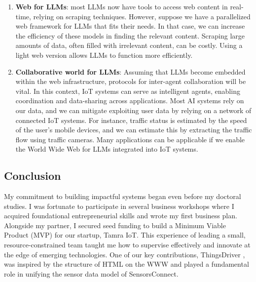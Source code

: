 \documentclass[10pt, letterpaper]{article}
\begin{document}
\begin{enumerate}[leftmargin=1.5em, label=\arabic*., itemsep=1em]
    \item \textbf{Web for LLMs}: most LLMs now have tools to access web content in real-time, relying on scraping techniques. However, suppose we have a parallelized web framework for LLMs that fits their needs. In that case, we can increase the efficiency of these models in finding the relevant content. Scraping large amounts of data, often filled with irrelevant content, can be costly. Using a light web version allows LLMs to function more efficiently. 

\item \textbf{Collaborative world for LLMs}:
Assuming that LLMs become embedded within the web infrastructure, protocols for inter-agent collaboration will be vital. In this context, IoT systems can serve as intelligent agents, enabling coordination and data-sharing across applications. Most AI systems rely on our data, and we can mitigate exploiting user data by relying on a network of connected IoT systems. For instance, traffic status is estimated by the speed of the user's mobile devices, and we can estimate this by extracting the traffic flow using traffic cameras. Many applications can be applicable if we enable the World Wide Web for LLMs integrated into IoT systems.

\end{enumerate}



\subsection*{Conclusion}
My commitment to building impactful systems began even before my doctoral studies. I was fortunate to participate in several business workshops where I acquired foundational entrepreneurial skills and wrote my first business plan. Alongside my partner, I secured seed funding to build a Minimum Viable Product (MVP) for our startup, Tamra IoT. This experience of leading a small, resource-constrained team taught me how to supervise effectively and innovate at the edge of emerging technologies. One of our key contributions, ThingsDriver \cite{ThingsDriver}, was inspired by the structure of HTML on the WWW and played a fundamental role in unifying the sensor data model of SensorsConnect. \vspace{0.2cm}
 
\end{document}
